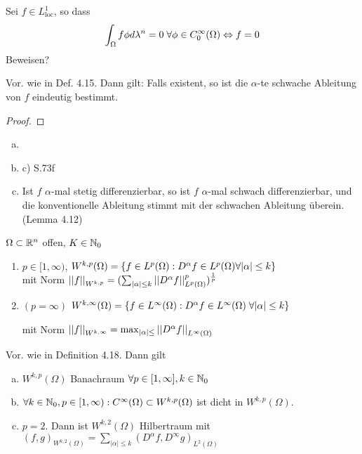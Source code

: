 	\begin{bem*}
		Sei $f\in L^1_{\text{loc}}$, so dass 
			$$\int_\Omega f \phi d\lambda^n = 0 \; \forall \phi \in C^\infty_0(\Omega) \overset{}{\Leftrightarrow} f = 0$$
	\todog[Übungsbeweis] Beweisen?
	\end{bem*}

	\begin{thm}
		Vor. wie in Def. 4.15. Dann gilt: Falls existent, 
		so ist die $\alpha$-te schwache Ableitung von $f$ eindeutig bestimmt. 
	\end{thm}

	\begin{proof}
		\todor 
	\end{proof}

	\begin{bsp}
		\begin{enumerate}[a)]
			\item {}
			\item c) S.73f
			\item Ist $f$ $\alpha$-mal stetig differenzierbar, so ist $f$ $\alpha$-mal schwach differenzierbar, und die konventionelle Ableitung stimmt mit der schwachen Ableitung überein. (Lemma 4.12)
		\end{enumerate}
	\end{bsp}

	\begin{definition}[Sobolevräume]
		$\Omega \subset \mathbb{R}^n$ offen, $K\in\mathbb{N}_0$	
		\begin{enumerate}
			\item $p\in [1,\infty)$, $W^{k,p}(\Omega) = \left\{f\in L^p(\Omega): D^\alpha f\in L^p(\Omega) \forall |\alpha| \leq k\right\}$ \\
				mit Norm $\left\lvert \left\lvert f \right\rvert \right\rvert_{W^{k,p}} = (\sum_{|\alpha| \leq k} \left\lvert \left\lvert D^\alpha f \right\rvert \right\rvert^p_{L^p(\Omega)})^{\frac{1}{p}}$
		\item $(p = \infty)$ $W^{k,\infty}(\Omega) = \left\{f\in L^\infty(\Omega): 
			D^\alpha f \in L^\infty(\Omega) \; \forall |\alpha| \leq k\right\}$ \par
			mit Norm $\left\lvert \left\lvert f \right\rvert \right\rvert_{W^{k,\infty}} = \max_{|\alpha| \leq} \left\lvert \left\lvert D^\alpha f \right\rvert \right\rvert_{L^\infty(\Omega)}$
		\end{enumerate}
	\end{definition}

	\begin{thm}[*]
		Vor. wie in Definition 4.18. Dann gilt 
			\begin{enumerate}[a)]
				\item $W^{k,p}(\Omega)$ Banachraum $\forall p\in[1,\infty], k\in \mathbb{N}_0$
				\item $\forall k\in \mathbb{N}_0, p\in [1,\infty): C^\infty(\Omega) \subset W^{k,p}(\Omega)$ ist dicht in $W^{k,p}(\Omega)$.
				\item $p =2$. Dann ist $W^{k,2}(\Omega)$ Hilbertraum mit $(f,g)_{W^{k,2}(\Omega)} = \sum_{|\alpha| \leq k} (D^\alpha f, D^\infty g)_{L^2(\Omega)}$
			\end{enumerate}
	\end{thm}


